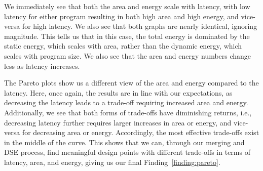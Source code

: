 We immediately see that both the area and energy scale with latency, with low latency for either program resulting in both high area and high energy, and vice-versa for high latency. We also see that both graphs are nearly identical, ignoring magnitude. This tells us that in this case, the total energy is dominated by the static energy, which scales with area, rather than the dynamic energy, which scales with program size. We also see that the area and energy numbers change less as latency increases.

The Pareto plots show us a different view of the area and energy compared to the latency. Here, once again, the results are in line with our expectations, as decreasing the latency leads to a trade-off requiring increased area and energy. Additionally, we see that both forms of trade-offs have diminishing returns, i.e., decreasing latency further requires larger increases in area or energy, and vice-versa for decreasing area or energy. Accordingly, the most effective trade-offs exist in the middle of the curve. This shows that we can, through our merging and DSE process, find meaningful design points with different trade-offs in terms of latency, area, and energy, giving us our final Finding~\ref{finding:pareto}.
